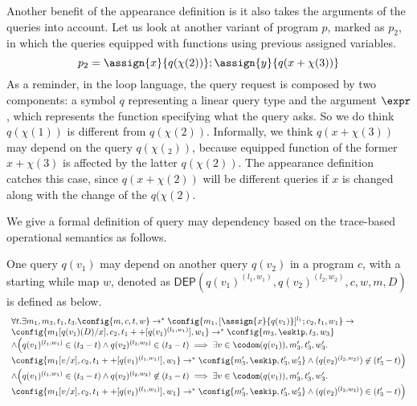     Another benefit of the appearance definition is it also takes the arguments of the queries into account. Let us look at another variant of program $p$, marked as $p_2$, in which the queries equipped with functions using previous assigned variables.
    \[
      p_2 = \assign{x}{q(\chi(2))} ; \assign{y}{q(x+\chi(3))}
   \]
    As a reminder, in the loop language, the query request is composed by two components: a symbol $q$ representing a linear query type and the argument $\expr$, which represents the function specifying what the query asks. So we do think $q(\chi(1))$ is different from $q(\chi(2))$. Informally, we think $q(x+\chi(3))$ may depend on the query $q(\chi(_2))$, because equipped function of the former $x+\chi(3)$ is affected by the latter $q(\chi(2))$. The appearance definition catches this case, since $q(x+\chi(2))$ will be different queries if $x$ is changed along with the change of the $q(\chi(2)$.    
   
   We give a formal definition of query may dependency based on the trace-based operational semantics as follows.
  \begin{defn}
One query $q(v_1)$ may depend on another query $q(v_2)$ in a program $c$, with a starting while map $w$, denoted as
$\mathsf{DEP}(q(v_1)^{(l_1, w_1)}, q(v_2)^{(l_2, w_2)}, c,w,m,D)$ is defined as below. 
\[
  \begin{array}{l}
     \forall  t. \exists m_1,m_3,t_1,t_3.
\config{m, c,  t,w} \rightarrow^{*} \config{m_1, [\assign{x}{q(v_1)}]^{l_1} ; c_2,
  t_1,w_1} \rightarrow \\ \config{m_1[q(v_1)(D)/x], c_2,
  t_1++[q(v_1)^{(l_1, w_1)}], w_1} \rightarrow^{*} \config{m_3, \eskip,
  t_3,w_3} \\  
  \land 
\Big( q(v_1)^{(l_1,w_1)} \in (t_3-t) \land q(v_2)^{(l_2,w_2)} \in (t_3-t) \implies  \exists v \in \codom(q(v_1)), m_3', t_3', w_3'.  \\
 \config{m_1[v/x], {c_2}, t_1++[q(v_1)^{(l_1,w_1)}], w_1} \rightarrow^{*} \config{m_3', \eskip, t_3', w_3'} \land (q(v_2)^{(l_2,w_2)}) \not \in (t_3'-t)
\Big)\\
\land 
\Big(q(v_1)^{(l_1,w_1)} \in (t_3-t) \land q(v_2)^{(l_2,w_2)} \not\in (t_3-t) \implies  \exists v \in \codom(q(v_1)),  m_3', t_3', w_3'. \\
 \config{m_1[v/x], {c_2}, t_1++[q(v_1)^{(l_1,w_1)}], w_1} \rightarrow^{*} \config{m_3', \eskip, t_3', w_3'} \land (q(v_2)^{(l_2,w_2)})  \in (t_3'-t)
\Big)\\
\end{array}
\]
\end{defn}


